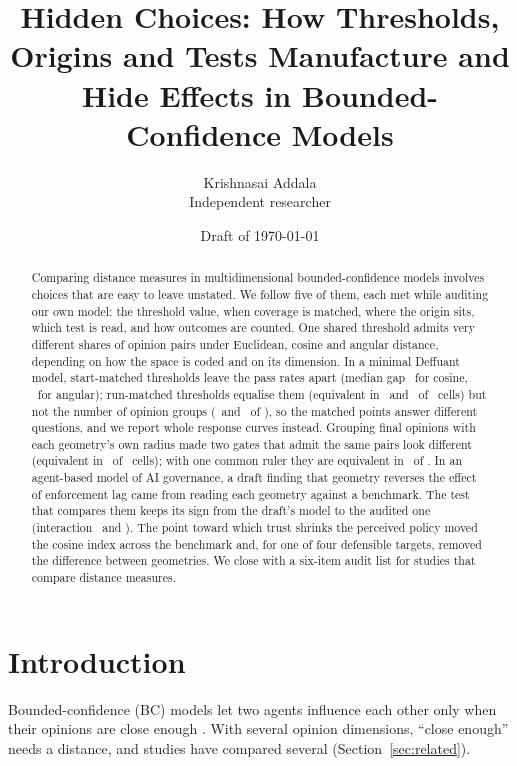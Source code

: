 \documentclass[11pt]{article}
\title{Hidden Choices: How Thresholds, Origins and Tests Manufacture and Hide Effects in Bounded-Confidence Models}
\author{Krishnasai Addala\\ \small Independent researcher}
\date{Draft of \today}
\begin{document}
\maketitle

\begin{abstract}
Comparing distance measures in multidimensional bounded-confidence models involves choices that are easy to leave unstated.
We follow five of them, each met while auditing our own model: the threshold value, when coverage is matched, where the origin sits, which test is read, and how outcomes are counted.
One shared threshold admits very different shares of opinion pairs under Euclidean, cosine and angular distance, depending on how the space is coded and on its dimension.
In a minimal Deffuant model, start-matched thresholds leave the pass rates apart (median gap \VTzeroPassGapCos\ for cosine, \VTzeroPassGapAng\ for angular); run-matched thresholds equalise them (equivalent in \VRunPassEquivCos\ and \VRunPassEquivAng\ of \VCellsPerGeom\ cells) but not the number of opinion groups (\VRunGroupEquivCos\ and \VRunGroupEquivAng\ of \VCellsPerGeom), so the matched points answer different questions, and we report whole response curves instead.
Grouping final opinions with each geometry's own radius made two gates that admit the same pairs look different (equivalent in \VCosAngOwnEquiv\ of \VCosAngCells\ cells); with one common ruler they are equivalent in \VCosAngCommonEquiv\ of \VCosAngCells.
In an agent-based model of AI governance, a draft finding that geometry reverses the effect of enforcement lag came from reading each geometry against a benchmark. The test that compares them keeps its sign from the draft's model to the audited one (interaction \VCDraftInter\ and \VCRecommendedInter). The point toward which trust shrinks the perceived policy moved the cosine index across the benchmark and, for one of four defensible targets, removed the difference between geometries.
We close with a six-item audit list for studies that compare distance measures.
\end{abstract}

\section{Introduction}

Bounded-confidence (BC) models let two agents influence each other only when their opinions are close enough \citep{deffuant2000,hegselmann2002}.
With several opinion dimensions, ``close enough'' needs a distance, and studies have compared several (Section~\ref{sec:related}).
\end{document}
